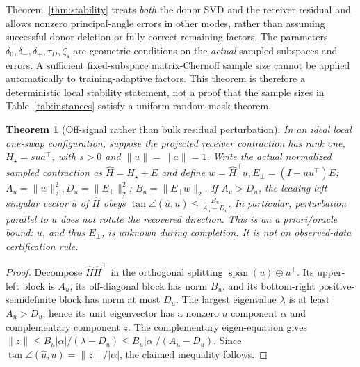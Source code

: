 \documentclass[review,10pt]{elsarticle}
\newtheorem{theorem}{Theorem}
\begin{document}
Theorem~\ref{thm:stability} treats \emph{both} the donor SVD and the receiver residual and allows nonzero principal-angle errors in other modes, rather than assuming successful donor deletion or fully correct remaining factors. The parameters $\delta_0,\delta_-,\delta_+,\tau_D,\zeta_s$ are geometric conditions on the \emph{actual} sampled subspaces and errors. A sufficient fixed-subspace matrix-Chernoff sample size cannot be applied automatically to training-adaptive factors. This theorem is therefore a deterministic local stability statement, not a proof that the sample sizes in Table~\ref{tab:instances} satisfy a uniform random-mask theorem.


\begin{theorem}[Off-signal rather than bulk residual perturbation]\label{thm:offsig}
In an ideal local one-swap configuration, suppose the projected receiver contraction has rank one, $H_\star=sua^\top$, with $s>0$ and $\|u\|=\|a\|=1$. Write the actual normalized sampled contraction as $\widehat H=H_\star+E$ and define
 \(w=\widehat H^\top u, E_\perp=(I-uu^\top)E\); \(A_u=\|w\|_2^2, D_u=\|E_\perp\|_2^2\); \(B_u=\|E_\perp w\|_2.\) 
If $A_u>D_u$, the leading left singular vector $\widehat u$ of $\widehat H$ obeys
 \(\tan\angle(\widehat u,u)\le\frac{B_u}{A_u-D_u}.\) 
In particular, perturbation parallel to $u$ does not rotate the recovered direction. This is an \emph{a priori/oracle} bound: $u$, and thus $E_\perp$, is unknown during completion. It is not an observed-data certification rule.
\end{theorem}
\begin{proof}
Decompose $\widehat H\widehat H^\top$ in the orthogonal splitting $\operatorname{span}(u)\oplus u^\perp$. Its upper-left block is $A_u$, its off-diagonal block has norm $B_u$, and its bottom-right positive-semidefinite block has norm at most $D_u$. The largest eigenvalue $\lambda$ is at least $A_u>D_u$; hence its unit eigenvector has a nonzero $u$ component $\alpha$ and complementary component $z$. The complementary eigen-equation gives
$\|z\|\le B_u|\alpha|/(\lambda-D_u)\le B_u|\alpha|/(A_u-D_u)$.
Since $\tan\angle(\widehat u,u)=\|z\|/|\alpha|$, the claimed inequality follows.
\end{proof}
\end{document}
